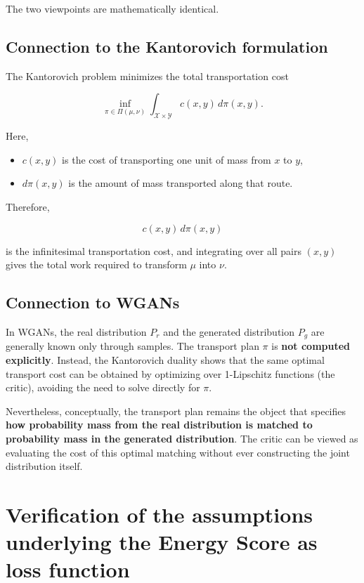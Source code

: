\begin{appendices}
The two viewpoints are mathematically identical.

\section*{Connection to the Kantorovich formulation}

The Kantorovich problem minimizes the total transportation cost

\[
\inf_{\pi\in\Pi(\mu,\nu)}
\int_{\mathcal X\times\mathcal Y}
c(x,y)\,d\pi(x,y).
\]

Here,

\begin{itemize}
    \item $c(x,y)$ is the cost of transporting one unit of mass from $x$ to $y$,
    \item $d\pi(x,y)$ is the amount of mass transported along that route.
\end{itemize}

Therefore,

\[
c(x,y)\,d\pi(x,y)
\]

is the infinitesimal transportation cost, and integrating over all pairs $(x,y)$ gives the total work required to transform $\mu$ into $\nu$.

\section*{Connection to WGANs}

In WGANs, the real distribution $P_r$ and the generated distribution $P_g$ are generally known only through samples. The transport plan $\pi$ is \textbf{not computed explicitly}. Instead, the Kantorovich duality shows that the same optimal transport cost can be obtained by optimizing over 1-Lipschitz functions (the critic), avoiding the need to solve directly for $\pi$.

Nevertheless, conceptually, the transport plan remains the object that specifies \textbf{how probability mass from the real distribution is matched to probability mass in the generated distribution}. The critic can be viewed as evaluating the cost of this optimal matching without ever constructing the joint distribution itself.





\chapter{Verification of the assumptions underlying the Energy Score as loss function}
\label{ch:condition_proofs}


\end{appendices}
